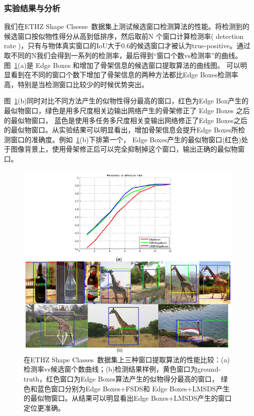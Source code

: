 \documentclass[UTF8]{ctexart}
\numberwithin{equation}{section} %
\numberwithin{table}{section} %
\begin{document}
\subsubsection{实验结果与分析}
我们在ETHZ Shape Clseese~\cite{ferrari2006object}数据集上测试候选窗口检测算法的性能。将检测到的候选窗口按似物性得分从高到低排序，然后取前N
个窗口计算检测率( detection rate )，只有与物体真实窗口的IoU大于0.6的候选窗口才被认为true-positive。通过取不同的N我们会得到一系列的检测率，最后得到“窗口个数vs检测率”的曲线。
图~\ref{fig:bbox_eval}(a)是 Edge Boxes 和增加了骨架信息的候选窗口提取算法的曲线图。
可以明显看到在不同的窗口个数下增加了骨架信息的两种方法都比Edge Boxes检测率高，特别是当检测窗口比较少的时候优势突出。

图~\ref{fig:bbox_eval}(b)同时对比不同方法产生的似物性得分最高的窗口，红色为Edge Box产生的最似物窗口，绿色是用多尺度相关边输出网络产生的骨架修正了 Edge Boxes 之后的最似物窗口，
蓝色是使用多任务多尺度相关变输出网络修正了Edge Boxes之后的最似物窗口。从实验结果可以明显看出，增加骨架信息会提升Edge Boxes所检测窗口的准确度。例如~\ref{fig:bbox_eval}(b)下排第一个，
Edge Boxes产生的最似物窗口(红色)处于图像背景上，使用骨架修正后可以完全抑制掉这个窗口，输出正确的最似物窗口。

\begin{figure}[H]
\centering
\includegraphics[scale=0.4]{figures/bbox_eval.png}
\caption{在ETHZ Shape Classes~\cite{ferrari2006object}数据集上三种窗口提取算法的性能比较：(a)检测率vs候选窗个数曲线；(b)检测结果样例，黄色窗口为ground-truth，红色窗口为Edge Boxes算法产生的似物得分最高的窗口，
绿色和蓝色窗口分别为Edge Boxes+FSDS和
Edge Boxes+LMSDS产生的最似物窗口。从结果可以明显看出Edge Boxes+LMSDS产生的窗口定位更准确。}
\label{fig:bbox_eval}
\end{figure}
\end{document}

